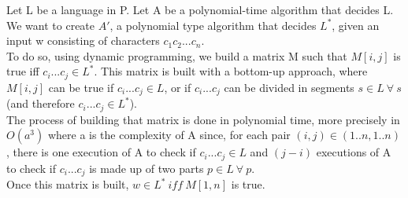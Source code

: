 
Let L be a language in P.
Let A be a polynomial-time algorithm that decides L.
We want to create $A'$, a polynomial type algorithm that decides $L^*$, given an input w consisting of characters $c_1c_2...c_n$.\\
To do so, using dynamic programming, we build a matrix M such that $M[i,j]$ is true iff $c_i...c_j \in L^*$. 
This matrix is built with a bottom-up approach, where $M[i,j]$ can be true if $c_i...c_j \in L$, or if $c_i...c_j$ can be divided in segments $s \in L\ \forall\ s$ (and therefore $c_i...c_j \in L^*$). \\
The process of building that matrix is done in polynomial time, more precisely in $O(a^3)$ where a is the complexity of A since, for each pair $(i,j) \in (1..n, 1..n)$, there is one execution of A to check if $c_i...c_j\in L$ and $(j - i)$ executions of A to check if $c_i...c_j$ is made up of two parts $p \in L\ \forall\ p$. \\
Once this matrix is built, $w \in L^*\ iff\ M[1,n]$ is true.
